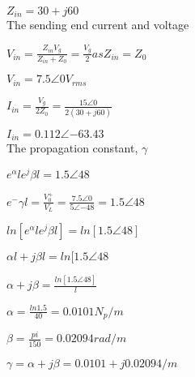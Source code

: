 \documentclass[10pt,a4paper]{report}
\begin{document}
$Z_{in}=30+j60$\\
The sending end current and voltage

$V_{in}=\frac{Z_{in}V_{g}}{Z_{in}+Z_{0}}=\frac{V_{g}}{2} as Z_{in}=Z_{0}$

$V_{in}=7.5\angle{0} V_{rms}$

$I_{in}=\frac{V_{g}}{2Z_{0}}=\frac{15\angle{0}}{2(30+j60)}$

$I_{in}=0.112\angle{-63.43}$\\
The propagation constant, $\gamma$

$e^\alpha l e^j\beta l = 1.5\angle{48}$

$e^-\gamma l= \frac {V_{0}^+}{V_{L}}=\frac{7.5\angle{0}}{5 \angle{-48}}=1.5 \angle{48}$

$ln[e^\alpha l e^j\beta l]= ln[1.5\angle{48}]$

$\alpha l+j\beta l= ln[1.5\angle{48}$

$\alpha+j\beta=\frac{ln[1.5\angle{48}]}{l}$

$\alpha=\frac{ln 1.5}{40}=0.0101 N_{p}/m$

$\beta=\frac{pi}{150}=0.02094 rad/m$

$\gamma=\alpha+j\beta=0.0101+j0.02094/m$
\end{document}
